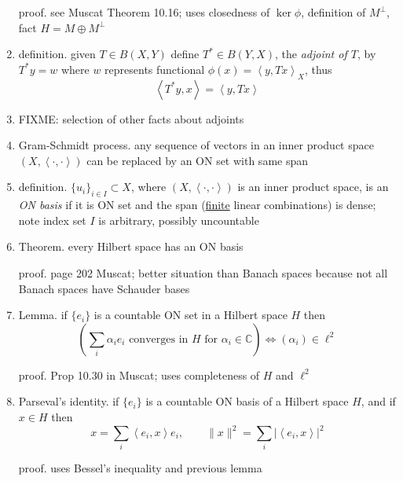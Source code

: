 \documentclass[11pt]{article}
\newcommand{\CC}{\mathbb{C}}
\newcommand{\ip}[2]{\ensuremath{\left<#1,#2\right>}}
\begin{document}
\begin{enumerate}
proof. see Muscat Theorem 10.16; uses closedness of $\ker \phi$, definition of $M^\perp$, fact $H=M\oplus M^\perp$

\item definition. given $T\in B(X,Y)$ define $T^*\in B(Y,X)$, the \emph{adjoint of $T$}, by $T^*y=w$ where $w$ represents functional $\phi(x) = \ip{y}{Tx}_X$, thus
    $$\ip{T^*y}{x} = \ip{y}{Tx}$$

\item FIXME: selection of other facts about adjoints

\item Gram-Schmidt process.  any sequence of vectors in an inner product space $(X,\ip{\cdot}{\cdot})$ can be replaced by an ON set with same span

\item definition. $\{u_i\}_{i\in I} \subset X$, where $(X,\ip{\cdot}{\cdot})$ is an inner product space, is an \emph{ON basis} if it is ON set and the span (\underline{finite} linear combinations) is dense; note index set $I$ is arbitrary, possibly uncountable

\item Theorem. every Hilbert space has an ON basis

proof. page 202 Muscat; better situation than Banach spaces because not all Banach spaces have Schauder bases

\item Lemma.  if $\{e_i\}$ is a countable ON set in a Hilbert space $H$ then
    $$\left(\sum_i \alpha_i e_i \text{ converges in $H$ for $\alpha_i\in \CC$}\right) \iff (\alpha_i)\in \ell^2$$

proof. Prop 10.30 in Muscat; uses completeness of $H$ and $\ell^2$

\item Parseval's identity. if $\{e_i\}$ is a countable ON basis of a Hilbert space $H$, and if $x\in H$ then
    $$x = \sum_i \ip{e_i}{x}e_i, \qquad \|x\|^2 = \sum_i |\ip{e_i}{x}|^2$$

proof. uses Bessel's inequality and previous lemma

\end{enumerate}
\end{document}
